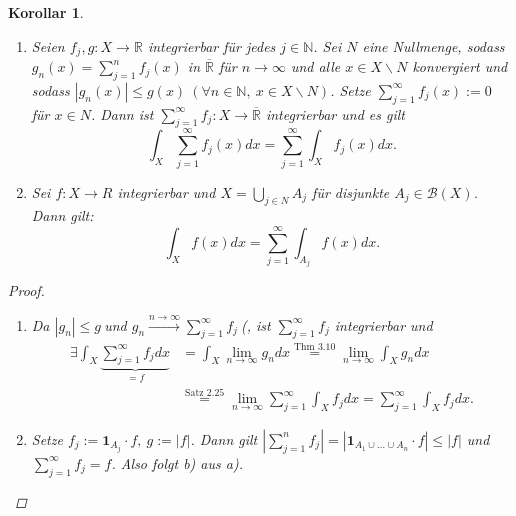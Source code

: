 \documentclass[a4paper]{scrreprt}
\newcommand{\doubleOne}{\textbf{1}}
\newcommand{\R}{\mathbb{R}}
\newcommand{\Rq}{\overline{\R}}
\newcommand{\N}{\mathbb{N}}
\newcommand{\Borel}{\mathcal{B}}
\newcommand{\toInf}{\rightarrow \infty}
\newcommand{\limToInf}[1]{\lim_{#1 \toInf}}
\newcommand{\jlabel}[1]{\label{j_#1}}
\newcommand{\jshortlink}[1]{\jhyperref{#1}{\text{#1}}}
\newcommand{\jhyperref}[2]{\hyperref[j_#1]{#2}}
\newcommand{\fu}{\text{\textit{(f.ü.)}}}
\newcommand{\jabb}[3]{ #1: #2 \rightarrow #3 }
\theoremstyle{plain}
\newtheorem{kor}[thm]{Korollar}
\theoremstyle{definition}
\begin{document}
{{{{\jlabel{Kor 3.13}
\begin{kor}
    \begin{enumerate}
        \item 
            Seien $\jabb{f_j,g}{X}{\R}$ integrierbar für jedes $j\in\N$. Sei $N$ eine Nullmenge, sodass $g_n(x)=\sum_{j=1}^n f_j(x)$ in $\Rq$ für $n\rightarrow\infty$ und alle $x\in X\backslash N$ konvergiert und sodass $|g_n(x)|\le g(x) \ (\forall n\in\N, \ x\in X\backslash N)$. Setze $\sum_{j=1}^\infty f_j(x) := 0$ für $x \in N$. Dann ist $\jabb{\sum_{j=1}^\infty f_j}{X}{\Rq}$ integrierbar und es gilt 
            \begin{displaymath}
                \int_X \sum_{j=1}^\infty f_j(x) dx = \sum_{j=1}^\infty \int_X f_j(x) dx.
            \end{displaymath}
        \item
            Sei $\jabb{f}{X}{R}$ integrierbar und $X = \bigcup_{j\in N} A_j$ für disjunkte $A_j \in \Borel(X)$. Dann gilt:
            \begin{displaymath}
                \int_X f(x) dx = \sum_{j=1}^\infty \int_{A_j} f(x) dx.
            \end{displaymath}
    \end{enumerate}
    \begin{proof}
        \begin{enumerate}
            \item
                Da $|g_n| \le g \ $\fu und $g_n \xrightarrow{n\rightarrow \infty} \sum_{j=1}^\infty f_j \ $(\fu, ist $\sum_{j=1}^\infty f_j$ integrierbar und 
                \begin{displaymath}
                    \begin{split}
                        \exists \int_X \underbrace{\sum_{j=1}^\infty f_j dx}_{=f} &= \int_X \limToInf{n} g_n dx \overset{\jshortlink{Thm 3.10}}{=} \limToInf{n} \int_X g_n dx \\
                        &\overset{\jshortlink{Satz 2.25}}{=} \limToInf{n} \sum_{j=1}^\infty \int_X f_j dx = \sum_{j=1}^\infty \int_X f_j dx.
                    \end{split}
                \end{displaymath}
                
            \item
                Setze $f_j := \doubleOne_{A_j} \cdot f, \ g := |f|$. Dann gilt $|\sum_{j=1}^n f_j| = |\doubleOne_{A_1 \cup \dots \cup A_n} \cdot f| \le |f|$ und $\sum_{j=1}^\infty f_j = f$. Also folgt b) aus a).
        \end{enumerate}
    \end{proof}
\end{kor}

}}}}
\end{document}
